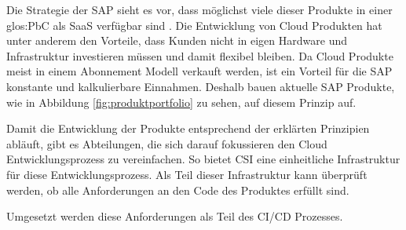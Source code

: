\documentclass[../main.tex]{subfiles}
\begin{document}
Die Strategie der SAP sieht es vor, dass möglichst viele dieser Produkte in einer \gls{glos:PbC} als \gls{SaaS} verfügbar sind \cite{SAPCloudStrategy}.
Die Entwicklung von Cloud Produkten hat unter anderem den Vorteile, dass Kunden nicht in eigen Hardware und Infrastruktur investieren müssen und damit flexibel bleiben.
Da Cloud Produkte meist in einem Abonnement Modell verkauft werden, ist ein Vorteil für die SAP konstante und kalkulierbare Einnahmen.
Deshalb bauen aktuelle SAP Produkte, wie in Abbildung \ref{fig:produktportfolio} zu sehen, auf diesem Prinzip auf.
\cite{CloudProContra}

Damit die Entwicklung der Produkte entsprechend der erklärten Prinzipien abläuft, gibt es Abteilungen, die sich darauf fokussieren den Cloud Entwicklungsprozess zu vereinfachen.
So bietet \gls{CSI} eine einheitliche Infrastruktur für diese Entwicklungsprozess.
Als Teil dieser Infrastruktur kann überprüft werden, ob alle Anforderungen an den Code des Produktes erfüllt sind. 

Umgesetzt werden diese Anforderungen als Teil des \gls{CI/CD} Prozesses.
\end{document}
